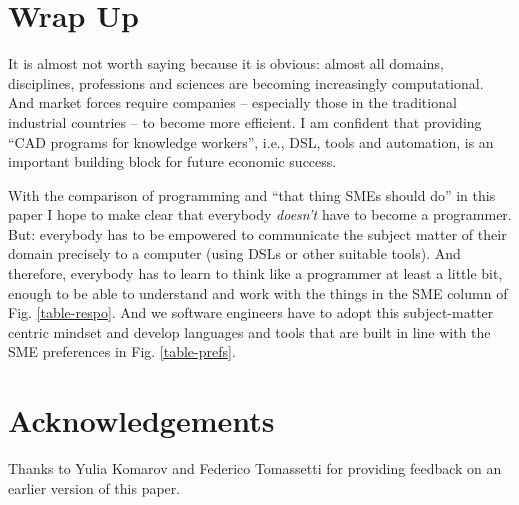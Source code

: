 \documentclass[runningheads]{llncs}
\newcommand{\fig}[1]{Fig. \ref{#1}}  %
\begin{document}
\section{Wrap Up}
\label{wrapUp}

It is almost not worth saying because it is obvious: almost all domains,
disciplines, professions and sciences are becoming increasingly computational.
And market forces require companies -- especially those in the traditional
industrial countries -- to become more efficient. I am confident that providing
``CAD programs for knowledge workers'', i.e., DSL, tools and automation, is an
important building block for future economic success.

With the comparison of programming and ``that thing SMEs should do'' in this
paper I hope to make clear that everybody \emph{doesn't} have to become a
programmer.
But: everybody has to be empowered to communicate the subject matter of their
domain precisely to a computer (using DSLs or other suitable tools). And
therefore, everybody has to learn to think like a programmer at least a little
bit, enough to be able to understand and work with the things in the SME column
of \fig{table-respo}. And we software engineers have to adopt this
subject-matter centric mindset and develop languages and tools that are built in
line with the SME preferences in \fig{table-prefs}.

\section*{Acknowledgements}

Thanks to Yulia Komarov and Federico Tomassetti for providing feedback on 
an earlier version of this paper.






\end{document}
